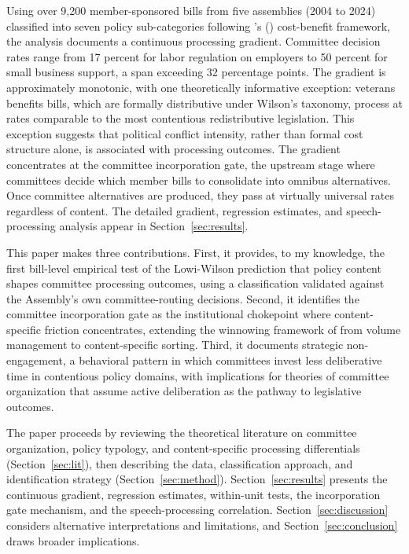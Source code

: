 \documentclass[11pt]{article}
\begin{document}
Using over 9,200 member-sponsored bills from five assemblies (2004 to 2024) classified into seven policy sub-categories following \citeauthor{wilson1980}'s (\citeyear{wilson1980}) cost-benefit framework, the analysis documents a continuous processing gradient. Committee decision rates range from 17 percent for labor regulation on employers to 50 percent for small business support, a span exceeding 32 percentage points. The gradient is approximately monotonic, with one theoretically informative exception: veterans benefits bills, which are formally distributive under Wilson's taxonomy, process at rates comparable to the most contentious redistributive legislation. This exception suggests that political conflict intensity, rather than formal cost structure alone, is associated with processing outcomes. The gradient concentrates at the committee incorporation gate, the upstream stage where committees decide which member bills to consolidate into omnibus alternatives. Once committee alternatives are produced, they pass at virtually universal rates regardless of content. The detailed gradient, regression estimates, and speech-processing analysis appear in Section~\ref{sec:results}.

This paper makes three contributions. First, it provides, to my knowledge, the first bill-level empirical test of the Lowi-Wilson prediction that policy content shapes committee processing outcomes, using a classification validated against the Assembly's own committee-routing decisions. Second, it identifies the committee incorporation gate as the institutional chokepoint where content-specific friction concentrates, extending the winnowing framework of \citet{krutz2005} from volume management to content-specific sorting. Third, it documents strategic non-engagement, a behavioral pattern in which committees invest less deliberative time in contentious policy domains, with implications for theories of committee organization that assume active deliberation as the pathway to legislative outcomes.

The paper proceeds by reviewing the theoretical literature on committee organization, policy typology, and content-specific processing differentials (Section~\ref{sec:lit}), then describing the data, classification approach, and identification strategy (Section~\ref{sec:method}). Section~\ref{sec:results} presents the continuous gradient, regression estimates, within-unit tests, the incorporation gate mechanism, and the speech-processing correlation. Section~\ref{sec:discussion} considers alternative interpretations and limitations, and Section~\ref{sec:conclusion} draws broader implications.
\end{document}
